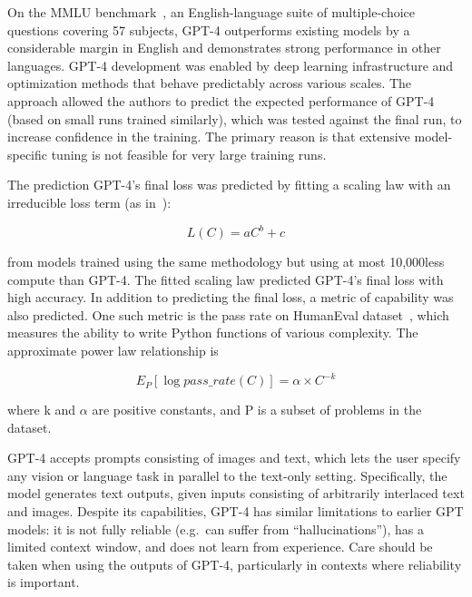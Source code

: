 On the MMLU benchmark~\cite{hendrycks2021measuring}, an English-language suite of multiple-choice questions covering 57 subjects, GPT-4 outperforms existing models by a considerable margin in English and demonstrates strong performance in other languages.
GPT-4 development was enabled by deep learning infrastructure and optimization methods that behave predictably across various scales.
The approach allowed the authors to predict the expected performance of GPT-4 (based on small runs trained similarly), which was tested against the final run, to increase confidence in the training.
The primary reason is that extensive model-specific tuning is not feasible for very large training runs.

The prediction GPT-4's final loss was predicted by fitting a scaling law with an irreducible loss term (as in~\textcite{henighan2020scaling}):

\begin{equation}
	L(C) = aC^b + c
	\label{eq:gpt4-scaling-law}
\end{equation}

\noindent from models trained using the same methodology but using at most 10,000\texttimes less compute than GPT-4.
The fitted scaling law predicted GPT-4's final loss with high accuracy.
In addition to predicting the final loss, a metric of capability was also predicted.
One such metric is the pass rate on HumanEval dataset~\cite{chen2021evaluating}, which measures the ability to write Python functions of various complexity.
The approximate power law relationship is

\begin{equation}
	E_P [\log{pass\_rate(C)}] = \alpha \times C^{-k}
	\label{eq:gpt4-pass-rate}
\end{equation}

\noindent where k and \(\alpha\) are positive constants, and P is a subset of problems in the dataset.

GPT-4 accepts prompts consisting of images and text, which lets the user specify any vision or language task in parallel to the text-only setting.
Specifically, the model generates text outputs, given inputs consisting of arbitrarily interlaced text and images.
Despite its capabilities, GPT-4 has similar limitations to earlier GPT models: it is not fully reliable (e.g.\ can suffer from \enquote{hallucinations}), has a limited context window, and does not learn from experience.
Care should be taken when using the outputs of GPT-4, particularly in contexts where reliability is important.


